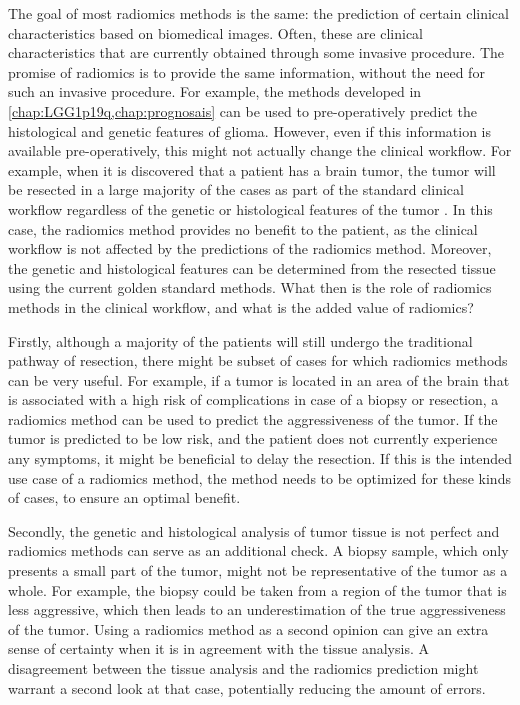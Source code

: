 The goal of most radiomics methods is the same: the prediction of certain clinical characteristics based on biomedical images.
Often, these are clinical characteristics that are currently obtained through some invasive procedure.
The promise of radiomics is to provide the same information, without the need for such an invasive procedure.
For example, the methods developed in \cref{chap:LGG1p19q,chap:prognosais} can be used to pre-operatively predict the histological and genetic features of glioma.
However, even if this information is available pre-operatively, this might not actually change the clinical workflow.
For example, when it is discovered that a patient has a brain \gls{tumor}, the \gls{tumor} will be resected in a large majority of the cases as part of the standard clinical workflow regardless of the genetic or histological features of the \gls{tumor} \autocite{welle2017gliomaguidelines,stupp2014hggguidelines}.
In this case, the radiomics method provides no benefit to the patient, as the clinical workflow is not affected by the predictions of the radiomics method.
Moreover, the genetic and histological features can be determined from the resected tissue using the current golden standard methods.
What then is the role of radiomics methods in the clinical workflow, and what is the added value of radiomics?

Firstly, although a majority of the patients will still undergo the traditional pathway of resection, there might be subset of cases for which radiomics methods can be very useful.
For example, if a \gls{tumor} is located in an area of the brain that is associated with a high risk of complications in case of a biopsy or resection, a radiomics method can be used to predict the aggressiveness of the \gls{tumor}.
If the \gls{tumor} is predicted to be low risk, and the patient does not currently experience any symptoms, it might be beneficial to delay the resection.
If this is the intended use case of a radiomics method, the method needs to be optimized for these kinds of cases, to ensure an optimal benefit.

Secondly, the genetic and histological analysis of \gls{tumor} tissue is not perfect and radiomics methods can serve as an additional check.
A biopsy sample, which only presents a small part of the \gls{tumor}, might not be representative of the \gls{tumor} as a whole.
For example, the biopsy could be taken from a region of the \gls{tumor} that is less aggressive, which then leads to an underestimation of the true aggressiveness of the \gls{tumor}.
Using a radiomics method as a second opinion can give an extra sense of certainty when it is in agreement with the tissue analysis.
A disagreement between the tissue analysis and the radiomics prediction might warrant a second look at that case, potentially reducing the amount of errors.

